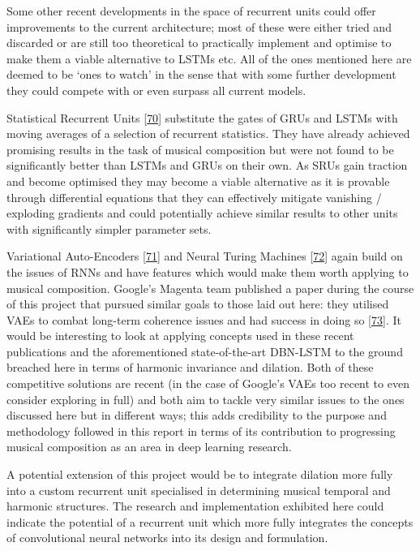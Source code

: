 \documentclass[12pt,]{article}
\begin{document}
Some other recent developments in the space of recurrent units could
offer improvements to the current architecture; most of these were
either tried and discarded or are still too theoretical to practically
implement and optimise to make them a viable alternative to LSTMs etc.
All of the ones mentioned here are deemed to be `ones to watch' in the
sense that with some further development they could compete with or even
surpass all current models.

Statistical Recurrent Units
{[}\protect\hyperlink{ref-oliva2017statistical}{70}{]} substitute the
gates of GRUs and LSTMs with moving averages of a selection of recurrent
statistics. They have already achieved promising results in the task of
musical composition but were not found to be significantly better than
LSTMs and GRUs on their own. As SRUs gain traction and become optimised
they may become a viable alternative as it is provable through
differential equations that they can effectively mitigate vanishing /
exploding gradients and could potentially achieve similar results to
other units with significantly simpler parameter sets.

Variational Auto-Encoders
{[}\protect\hyperlink{ref-roberts2017hierarchical}{71}{]} and Neural
Turing Machines {[}\protect\hyperlink{ref-graves2014neural}{72}{]} again
build on the issues of RNNs and have features which would make them
worth applying to musical composition. Google's Magenta team published a
paper during the course of this project that pursued similar goals to
those laid out here: they utilised VAEs to combat long-term coherence
issues and had success in doing so
{[}\protect\hyperlink{ref-roberts2018hierarchical}{73}{]}. It would be
interesting to look at applying concepts used in these recent
publications and the aforementioned state-of-the-art DBN-LSTM to the
ground breached here in terms of harmonic invariance and dilation. Both
of these competitive solutions are recent (in the case of Google's VAEs
too recent to even consider exploring in full) and both aim to tackle
very similar issues to the ones discussed here but in different ways;
this adds credibility to the purpose and methodology followed in this
report in terms of its contribution to progressing musical composition
as an area in deep learning research.

A potential extension of this project would be to integrate dilation
more fully into a custom recurrent unit specialised in determining
musical temporal and harmonic structures. The research and
implementation exhibited here could indicate the potential of a
recurrent unit which more fully integrates the concepts of convolutional
neural networks into its design and formulation.
\end{document}

